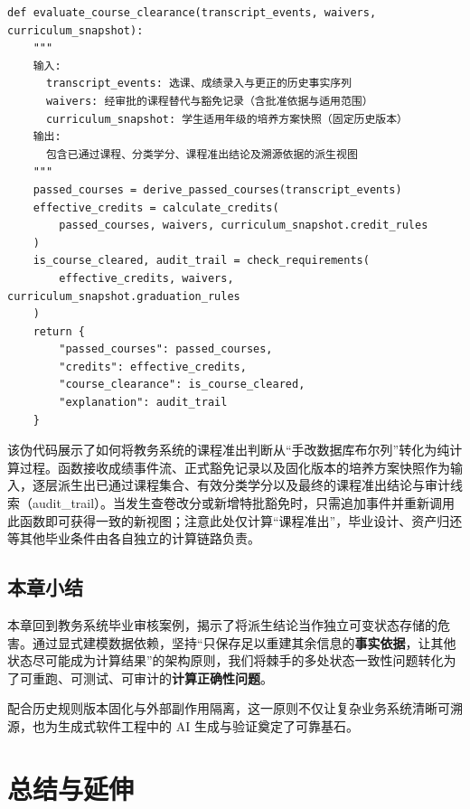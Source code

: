 \documentclass[UTF8,a4paper,11pt,fontset=fandol]{ctexart}
\begin{document}
\begin{lstlisting}[basicstyle={\ttfamily\small\linespread{1}\selectfont},captionpos=t,caption={教务系统毕业课程准出审核的显式数据依赖伪代码}]
def evaluate_course_clearance(transcript_events, waivers, curriculum_snapshot):
    """
    输入:
      transcript_events: 选课、成绩录入与更正的历史事实序列
      waivers: 经审批的课程替代与豁免记录（含批准依据与适用范围）
      curriculum_snapshot: 学生适用年级的培养方案快照（固定历史版本）
    输出:
      包含已通过课程、分类学分、课程准出结论及溯源依据的派生视图
    """
    passed_courses = derive_passed_courses(transcript_events)
    effective_credits = calculate_credits(
        passed_courses, waivers, curriculum_snapshot.credit_rules
    )
    is_course_cleared, audit_trail = check_requirements(
        effective_credits, waivers, curriculum_snapshot.graduation_rules
    )
    return {
        "passed_courses": passed_courses,
        "credits": effective_credits,
        "course_clearance": is_course_cleared,
        "explanation": audit_trail
    }
\end{lstlisting}

该伪代码展示了如何将教务系统的课程准出判断从“手改数据库布尔列”转化为纯计算过程。函数接收成绩事件流、正式豁免记录以及固化版本的培养方案快照作为输入，逐层派生出已通过课程集合、有效分类学分以及最终的课程准出结论与审计线索（audit\_trail）。当发生查卷改分或新增特批豁免时，只需追加事件并重新调用此函数即可获得一致的新视图；注意此处仅计算“课程准出”，毕业设计、资产归还等其他毕业条件由各自独立的计算链路负责。

\subsection{本章小结}

本章回到教务系统毕业审核案例，揭示了将派生结论当作独立可变状态存储的危害。通过显式建模数据依赖，坚持“只保存足以重建其余信息的\textbf{事实依据}，让其他状态尽可能成为计算结果”的架构原则，我们将棘手的多处状态一致性问题转化为了可重跑、可测试、可审计的\textbf{计算正确性问题}。

配合历史规则版本固化与外部副作用隔离，这一原则不仅让复杂业务系统清晰可溯源，也为生成式软件工程中的 AI 生成与验证奠定了可靠基石。

\section{总结与延伸}
\end{document}
